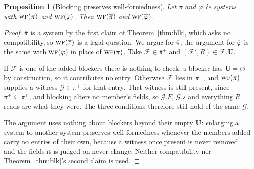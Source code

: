 \documentclass[11pt,a4paper]{article}
\renewcommand{\emptyset}{\varnothing}
\newcommand{\uses}{\mathbf{U}}
\newcommand{\WF}{\op{wf}}
\newcommand{\F}{\mathcal{F}}
\newcommand{\G}{\mathcal{G}}
\newcommand{\op}[1]{\textsc{#1}}
\theoremstyle{accentdef}
\theoremstyle{accentplain}
\newtheorem{proposition}[definition]{Proposition}
\begin{document}
\begin{proposition}[Blocking preserves well-formedness]\label{prop:wfblk}
Let $\pi$ and $\varphi$ be systems with $\WF(\pi)$ and $\WF(\varphi)$. Then $\WF(\overline{\pi})$
and $\WF(\overline{\varphi})$.
\end{proposition}

\begin{proof}
$\overline{\pi}$ is a system by the first claim of Theorem~\ref{thm:blk}, which asks no
compatibility, so $\WF(\overline{\pi})$ is a legal question. We argue for $\overline{\pi}$; the
argument for $\overline{\varphi}$ is the same with $\WF(\varphi)$ in place of $\WF(\pi)$. Take
$\F \in \overline{\pi}^{+}$ and $(\F',R) \in \F.\uses$.

If $\F$ is one of the added blockers there is nothing to check: a blocker has
$\uses = \emptyset$ by construction, so it contributes no entry. Otherwise $\F$ lies in $\pi^{+}$,
and $\WF(\pi)$ supplies a witness $\G \in \pi^{+}$ for that entry. That witness is still present,
since $\pi^{+} \subseteq \overline{\pi}^{+}$, and blocking alters no member's fields, so $\G.F$,
$\G.s$ and everything $R$ reads are what they were. The three conditions therefore still hold of
the same $\G$.

The argument uses nothing about blockers beyond their empty $\uses$: enlarging a system to another
system preserves well-formedness whenever the members added carry no entries of their own, because
a witness once present is never removed and the fields it is judged on never change. Neither
compatibility nor Theorem~\ref{thm:blk}'s second claim is used.
\end{proof}
\end{document}
